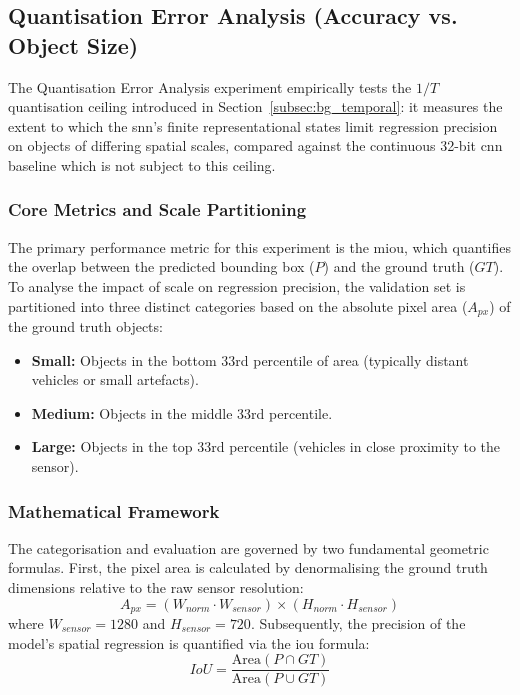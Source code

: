 \subsection{Quantisation Error Analysis (Accuracy vs. Object Size)}
\label{subsec:quantization_error_setup}

The Quantisation Error Analysis experiment empirically tests the $1/T$ quantisation ceiling introduced in Section~\ref{subsec:bg_temporal}: it measures the extent to which the \gls{snn}'s finite representational states limit regression precision on objects of differing spatial scales, compared against the continuous 32-bit \gls{cnn} baseline which is not subject to this ceiling.

\subsubsection{Core Metrics and Scale Partitioning}
The primary performance metric for this experiment is the \gls{miou}, which quantifies the overlap between the predicted bounding box ($P$) and the ground truth ($GT$). To analyse the impact of scale on regression precision, the validation set is partitioned into three distinct categories based on the absolute pixel area ($A_{px}$) of the ground truth objects:
\begin{itemize}
    \item \textbf{Small:} Objects in the bottom 33rd percentile of area (typically distant vehicles or small artefacts).
    \item \textbf{Medium:} Objects in the middle 33rd percentile.
    \item \textbf{Large:} Objects in the top 33rd percentile (vehicles in close proximity to the sensor).
\end{itemize}

\subsubsection{Mathematical Framework}
The categorisation and evaluation are governed by two fundamental geometric formulas. First, the pixel area is calculated by denormalising the ground truth dimensions relative to the raw sensor resolution:
\begin{equation}
    A_{px} = (W_{norm} \cdot W_{sensor}) \times (H_{norm} \cdot H_{sensor})
\end{equation}
where $W_{sensor} = 1280$ and $H_{sensor} = 720$. Subsequently, the precision of the model's spatial regression is quantified via the \gls{iou} formula:
\begin{equation}
    IoU = \frac{\text{Area}(P \cap GT)}{\text{Area}(P \cup GT)}
\end{equation}

